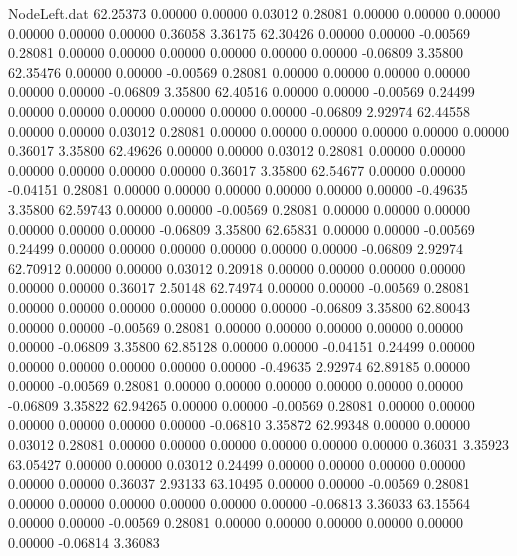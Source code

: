 \begin{filecontents}{NodeLeft.dat}
  62.25373    0.00000    0.00000     0.03012    0.28081    0.00000    0.00000    0.00000    0.00000    0.00000    0.00000    0.36058    3.36175
  62.30426    0.00000    0.00000    -0.00569    0.28081    0.00000    0.00000    0.00000    0.00000    0.00000    0.00000   -0.06809    3.35800
  62.35476    0.00000    0.00000    -0.00569    0.28081    0.00000    0.00000    0.00000    0.00000    0.00000    0.00000   -0.06809    3.35800
  62.40516    0.00000    0.00000    -0.00569    0.24499    0.00000    0.00000    0.00000    0.00000    0.00000    0.00000   -0.06809    2.92974
  62.44558    0.00000    0.00000     0.03012    0.28081    0.00000    0.00000    0.00000    0.00000    0.00000    0.00000    0.36017    3.35800
  62.49626    0.00000    0.00000     0.03012    0.28081    0.00000    0.00000    0.00000    0.00000    0.00000    0.00000    0.36017    3.35800
  62.54677    0.00000    0.00000    -0.04151    0.28081    0.00000    0.00000    0.00000    0.00000    0.00000    0.00000   -0.49635    3.35800
  62.59743    0.00000    0.00000    -0.00569    0.28081    0.00000    0.00000    0.00000    0.00000    0.00000    0.00000   -0.06809    3.35800
  62.65831    0.00000    0.00000    -0.00569    0.24499    0.00000    0.00000    0.00000    0.00000    0.00000    0.00000   -0.06809    2.92974
  62.70912    0.00000    0.00000     0.03012    0.20918    0.00000    0.00000    0.00000    0.00000    0.00000    0.00000    0.36017    2.50148
  62.74974    0.00000    0.00000    -0.00569    0.28081    0.00000    0.00000    0.00000    0.00000    0.00000    0.00000   -0.06809    3.35800
  62.80043    0.00000    0.00000    -0.00569    0.28081    0.00000    0.00000    0.00000    0.00000    0.00000    0.00000   -0.06809    3.35800
  62.85128    0.00000    0.00000    -0.04151    0.24499    0.00000    0.00000    0.00000    0.00000    0.00000    0.00000   -0.49635    2.92974
  62.89185    0.00000    0.00000    -0.00569    0.28081    0.00000    0.00000    0.00000    0.00000    0.00000    0.00000   -0.06809    3.35822
  62.94265    0.00000    0.00000    -0.00569    0.28081    0.00000    0.00000    0.00000    0.00000    0.00000    0.00000   -0.06810    3.35872
  62.99348    0.00000    0.00000     0.03012    0.28081    0.00000    0.00000    0.00000    0.00000    0.00000    0.00000    0.36031    3.35923
  63.05427    0.00000    0.00000     0.03012    0.24499    0.00000    0.00000    0.00000    0.00000    0.00000    0.00000    0.36037    2.93133
  63.10495    0.00000    0.00000    -0.00569    0.28081    0.00000    0.00000    0.00000    0.00000    0.00000    0.00000   -0.06813    3.36033
  63.15564    0.00000    0.00000    -0.00569    0.28081    0.00000    0.00000    0.00000    0.00000    0.00000    0.00000   -0.06814    3.36083

\end{filecontents}
